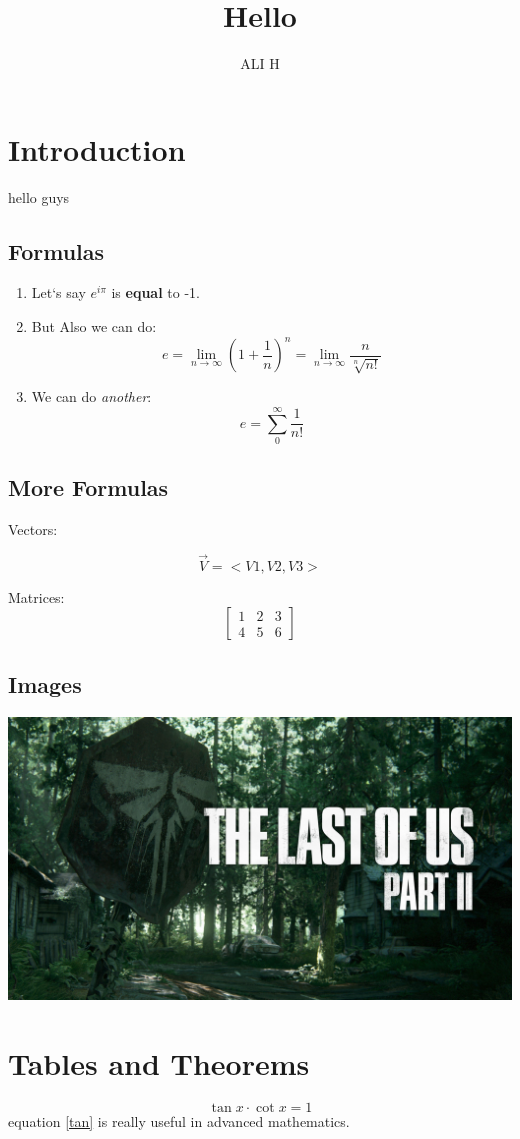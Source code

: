 \documentclass[12pt]{article}
\title{Hello}
\author{ALI H}
\date
\begin{document}
\maketitle

\section{Introduction}
hello guys

\subsection{Formulas}
\begin{enumerate}
\item 
Let`s say $e^{i\pi}$ is \textbf{equal} to -1. %
\item 
But Also we can do: 
$$ e = \lim_{n \to \infty } \left ( 1 + \frac{1}{n} \right ) ^n = \lim_{n \to \infty } \frac{n}{\sqrt[n]{n!}}$$
\item
We can do \textit{another}:
$$ e = \sum_{0}^{\infty} \frac{1}{n!}$$
\end{enumerate}

\subsection{More Formulas}
\hspace{0.61cm}Vectors:

$$\vec{V} =<V1, V2, V3>$$

Matrices:
$$
\begin{bmatrix}
    1 & 2 & 3\\
    4 & 5 & 6
\end{bmatrix}
$$

\subsection{Images}

\includegraphics[scale = 0.1]{LOS2.jpg}
\\

\section{Tables and Theorems}
\begin{equation}
    \tan x \cdot \cot x = 1
    \label{tan}
\end{equation}
equation \eqref{tan} is really useful in advanced mathematics.
\end{document}
